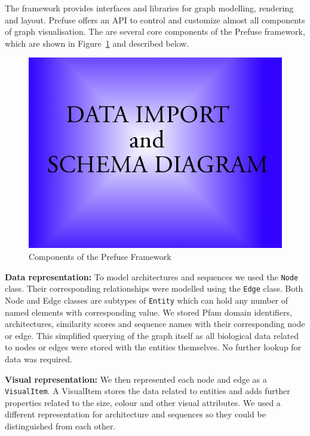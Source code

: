 The framework provides interfaces and libraries for graph modelling, rendering and layout. Prefuse offers an API to control and customize almost all components of graph visualisation. The are several core components of the Prefuse framework, which are shown in Figure~\ref{prefuseframework} and described below.

\begin{figure}[h]
 \begin{center}
 \includegraphics[scale=0.5]{figures/placeholder.jpg}
 \end{center}
 \caption{Components of the Prefuse Framework}
 \label{prefuseframework}
\end{figure}

\textbf{Data representation:} To model architectures and sequences we used the \texttt{Node} class. Their corresponding relationships were modelled using the \texttt{Edge} class. Both Node and Edge classes are subtypes of \texttt{Entity} which can hold any number of named elements with corresponding value. We stored Pfam domain identifiers, architectures, similarity scores and sequence names with their corresponding node or edge. This simplified querying of the graph itself as all biological data related to nodes or edges were stored with the entities themselves. No further lookup for data was required.

\textbf{Visual representation:} We then represented each node and edge as a \texttt{VisualItem}. A VisualItem stores the data related to entities and adds further properties related to the size, colour and other visual attributes. We used a different representation for architecture and sequences so they could be distinguished from each other.

